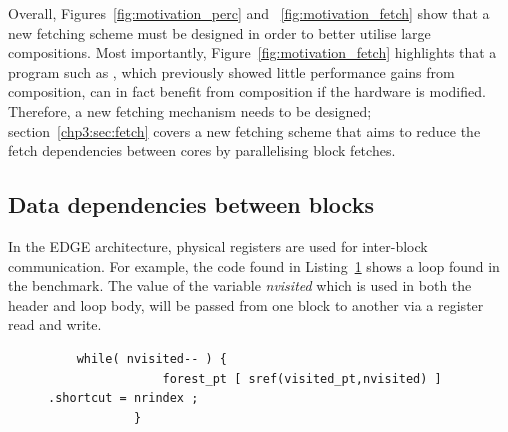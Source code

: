 Overall, Figures~\ref{fig:motivation_perc} and ~\ref{fig:motivation_fetch} show that a new fetching scheme must be designed in order to better utilise large compositions.
Most importantly, Figure~\ref{fig:motivation_fetch} highlights that a program such as , which previously showed little performance gains from composition, can in fact benefit from composition if the hardware is modified.
Therefore, a new fetching mechanism needs to be designed; section~\ref{chp3:sec:fetch} covers a new fetching scheme that aims to reduce the fetch dependencies between cores by parallelising block fetches.

\subsection{Data dependencies between blocks}

In the EDGE architecture, physical registers are used for inter-block communication.
For example, the code found in Listing~\ref{lst:mser_snipet} shows a loop found in the  benchmark.
The value of the variable \textit{nvisited} which is used in both the header and loop body, will be passed from one block to another via a register read and write.


\begin{figure}[t]
\lstset{language=C,numbersep=4pt}
\begin{center}
\begin{lstlisting}
	while( nvisited-- ) {
				forest_pt [ sref(visited_pt,nvisited) ] .shortcut = nrindex ;
			}
\end{lstlisting}
\end{center}
\vspace{-1em}
\label{lst:mser_snipet}
\vspace{1em}
\end{figure}

